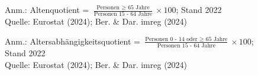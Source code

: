 \begin{figure}[p]
	{\centering {}}
	\label{map:alte}
	\begin{spacing}{1} \scriptsize
		Anm.: Altenquotient = $\frac{\text{Personen $\geq$ 65 Jahre}}{\text{Personen 15 - 64 Jahre}} \times 100$; Stand 2022\\
		Quelle: Eurostat (2024); Ber. \& Dar. imreg (2024) \end{spacing}
\end{figure}


\begin{figure}[p]
	{\centering {}}
	\label{map:altersabh}
	\begin{spacing}{1} \scriptsize
		Anm.: Altersabhängigkeitsquotient = $\frac{\text{Personen 0 - 14 oder $\geq$ 65 Jahre}}{\text{Personen 15 - 64 Jahre}} \times 100$; Stand 2022\\
		Quelle: Eurostat (2024); Ber. \& Dar. imreg (2024) \end{spacing}
\end{figure}


